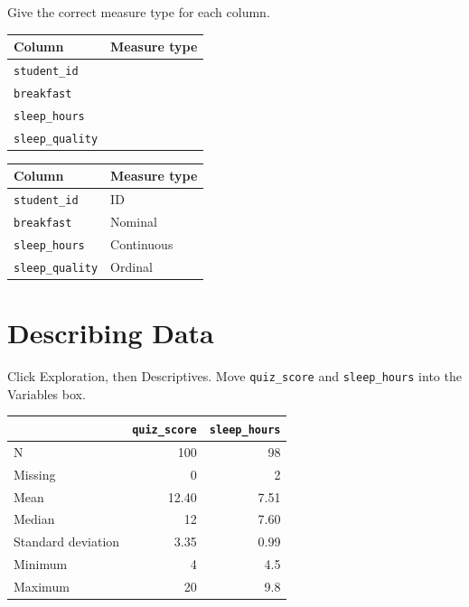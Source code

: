\begin{Exercise}[title={Measure Types}, label={ex:jamovi-measure-types}]
Give the correct measure type for each column.

\begin{center}
\begin{tabular}{|l|p{4cm}|}
\hline
Column & Measure type \\
\hline
\texttt{student\_id} & \\
\hline
\texttt{breakfast} & \\
\hline
\texttt{sleep\_hours} & \\
\hline
\texttt{sleep\_quality} & \\
\hline
\end{tabular}
\end{center}
\end{Exercise}
\begin{Answer}[ref={ex:jamovi-measure-types}]
\begin{center}
\begin{tabular}{|l|p{4cm}|}
\hline
Column & Measure type \\
\hline
\texttt{student\_id} & ID \\
\hline
\texttt{breakfast} & Nominal \\
\hline
\texttt{sleep\_hours} & Continuous \\
\hline
\texttt{sleep\_quality} & Ordinal \\
\hline
\end{tabular}
\end{center}
\end{Answer}

\section{Describing Data}

Click Exploration, then Descriptives. Move \texttt{quiz\_score} and \texttt{sleep\_hours} into the Variables box.

\begin{center}
\begin{tabular}{|l|r|r|}
\hline
 & \texttt{quiz\_score} & \texttt{sleep\_hours} \\
\hline
N & 100 & 98 \\
\hline
Missing & 0 & 2 \\
\hline
Mean & 12.40 & 7.51 \\
\hline
Median & 12 & 7.60 \\
\hline
Standard deviation & 3.35 & 0.99 \\
\hline
Minimum & 4 & 4.5 \\
\hline
Maximum & 20 & 9.8 \\
\hline
\end{tabular}
\end{center}

